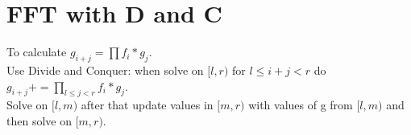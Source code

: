 \section{FFT with D and C}

To calculate $g_{i + j} = \prod f_i * g_j$.\\

Use Divide and Conquer: when solve on $[l, r)$ for $l \le i + j < r$ do $g_{i + j} += \prod_{l \le j < r} f_i * g_j$.\\

Solve on $[l, m)$ after that update values in $[m, r)$ with values of g from $[l, m)$ and then solve on $[m, r)$. 

